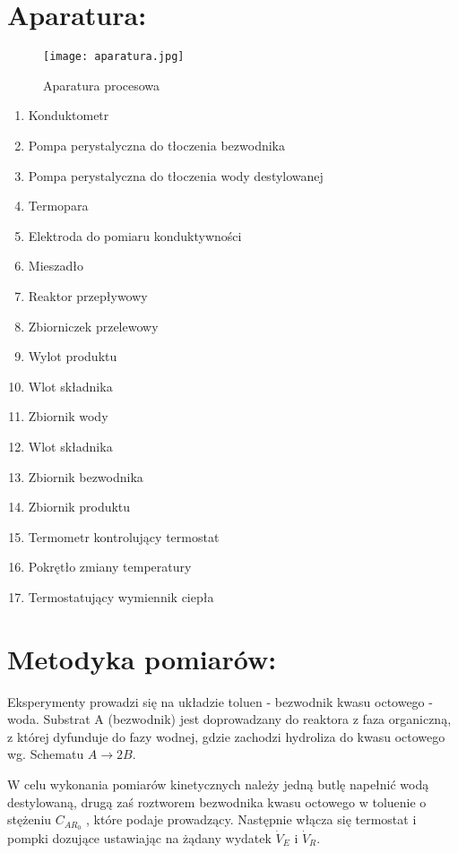 \documentclass[11pt]{article}
\begin{document}
\section{Aparatura:}
\begin{figure}[h!]
\centering
\texttt{[image: aparatura.jpg]}
\caption{Aparatura procesowa}
\end{figure}
\begin{multicols}{3}
\begin{enumerate}
\item Konduktometr
\item Pompa perystalyczna do tłoczenia bezwodnika
\item Pompa perystalyczna do tłoczenia wody destylowanej
\item Termopara
\item Elektroda do pomiaru konduktywności
\item Mieszadło
\item Reaktor przepływowy
\item Zbiorniczek przelewowy
\item Wylot produktu
\item Wlot składnika
\item Zbiornik wody
\item Wlot składnika
\item Zbiornik bezwodnika
\item Zbiornik produktu
\item Termometr kontrolujący termostat
\item Pokrętło zmiany temperatury
\item Termostatujący wymiennik ciepła
\end{enumerate}
\end{multicols}
\section{Metodyka pomiarów:}
\par Eksperymenty prowadzi się na układzie toluen - bezwodnik kwasu octowego - 
woda. Substrat A (bezwodnik) jest doprowadzany do reaktora z faza organiczną, z 
której dyfunduje do fazy wodnej, gdzie zachodzi hydroliza do kwasu octowego wg. 
Schematu $A \rightarrow 2B$.
\par W celu wykonania pomiarów kinetycznych należy jedną butlę napełnić wodą 
destylowaną, drugą zaś roztworem bezwodnika kwasu octowego w toluenie o stężeniu 
$C_{{AR}_0}$ , które podaje prowadzący.  Następnie włącza się termostat i pompki  dozujące 
ustawiając na żądany wydatek $\dot{V}_E$ i $\dot{V}_R$.
\end{document}
